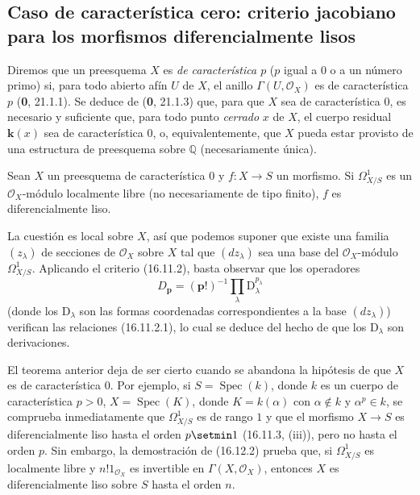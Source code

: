 \subsection{Caso de característica cero: criterio jacobiano para los
morfismos diferencialmente lisos}
\label{IV.16.12}

\begin{env}[16.12.1]
\label{IV.16.12.1}
Diremos que un preesquema $X$ es \emph{de característica $p$} ($p$ igual a $0$
o a un número primo) si, para todo abierto afín $U$ de $X$, el anillo
$\Gamma(U,\mathcal{O}_X)$ es de característica $p$ (\textbf 0, 21.1.1). Se deduce
de (\textbf 0, 21.1.3) que, para que $X$ sea de característica $0$, es necesario y
suficiente que, para todo punto \emph{cerrado} $x$ de $X$, el cuerpo residual
$\boldsymbol k(x)$ sea de característica $0$, o, equivalentemente, que $X$ pueda estar
provisto de una estructura de preesquema sobre $\mathbb{Q}$ (necesariamente
única).
\end{env}

\begin{theorem}[16.12.2]
\label{IV.16.12.2}
Sean $X$ un preesquema de característica $0$ y $f:X\to S$ un morfismo. Si
$\varOmega_{X/S}^1$ es un $\mathcal{O}_X$-módulo localmente libre (no
necesariamente de tipo finito), $f$ es diferencialmente liso.
\end{theorem}

La cuestión es local sobre $X$, así que podemos suponer que existe una familia
$(z_\lambda)$ de secciones de $\mathcal{O}_X$ sobre $X$ tal que $(dz_\lambda)$
sea una base del $\mathcal{O}_X$-módulo $\varOmega_{X/S}^1$. Aplicando el criterio
(16.11.2), basta observar que los operadores
\[
  D_{\mathbf{p}}=(\mathbf{p}!)^{-1}
  \prod_\lambda \mathrm D_\lambda^{p_\lambda}
\]
(donde los $\mathrm D_\lambda$ son las formas coordenadas correspondientes a la base
$(dz_\lambda)$) verifican las relaciones (16.11.2.1), lo cual se deduce del
hecho de que los $\mathrm D_\lambda$ son derivaciones.

\begin{env}[16.12.3]
\label{IV.16.12.3}
El teorema anterior deja de ser cierto cuando se abandona la hipótesis de que
$X$ es de característica $0$. Por ejemplo, si
$S=\operatorname{Spec}(k)$, donde $k$ es un cuerpo de característica $p>0$,
$X=\operatorname{Spec}(K)$, donde $K=k(\alpha)$ con
$\alpha\notin k$ y $\alpha^p\in k$, se comprueba inmediatamente
que $\varOmega_{X/S}^1$ es de rango $1$ y que el morfismo $X\to S$ es
diferencialmente liso hasta el orden $p\setmin 1$ (16.11.3, (iii)), pero no hasta
el orden $p$. Sin embargo, la demostración de (16.12.2) prueba que, si
$\varOmega_{X/S}^1$ es localmente libre y $n!1_{\mathcal{O}_X}$ es invertible en
$\Gamma(X,\mathcal{O}_X)$, entonces $X$ es diferencialmente liso sobre $S$
hasta el orden $n$.
\end{env}
